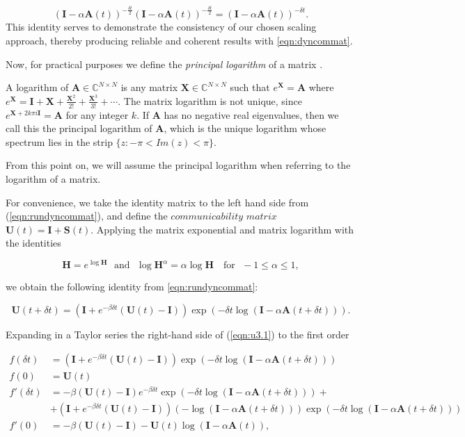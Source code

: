  $$(\mathbf{I} - \alpha\mathbf{A}(t))^{-\frac{\delta t}{2}} (\mathbf{I} - \alpha\mathbf{A}(t))^{-\frac{\delta t}{2}} = (\mathbf{I} - \alpha\mathbf{A}(t))^{-\delta t}.$$ This identity serves to demonstrate the consistency of our chosen scaling approach, thereby producing reliable and coherent results with \eqref{eqn:dyncommat}.
 
Now, for practical purposes we define the \textit{principal logarithm} of a matrix \cite[Ch.\ 11]{higham2008functions}.
\begin{definition}
    A logarithm of $\mathbf{A} \in \mathbb{C}^{N\times N}$ is any matrix $\mathbf{X}\in \mathbb{C}^{N\times N}$ such that $e^{\mathbf{X}} = \mathbf{A}$ where $e^{\mathbf{X}} = \mathbf{I} + \mathbf{X} + \frac{\mathbf{X}^2}{2!} + \frac{\mathbf{X}^3}{3!} + \cdots$. The matrix logarithm is not unique, since $e^{\mathbf{X}+2k\pi i\mathbf{I}} = \mathbf{A}$ for any integer $k$. If $\mathbf{A}$ has no negative real eigenvalues, then we call this the principal logarithm of $\mathbf{A}$, which is the unique logarithm whose spectrum lies in the strip $\{ z : −\pi < Im(z) < \pi \}$.
\end{definition}
From this point on, we will assume the principal logarithm when referring to the logarithm of a matrix. 

For convenience, we take the identity matrix to the left hand side from (\ref{eqn:rundyncommat}), and define the $\textit{communicability matrix~}$ $\mathbf{U}(t)=\mathbf{I} + \mathbf{S}(t)$. Applying the matrix exponential and matrix logarithm with the identities \cite[Ch.\ 11]{higham2008functions}

$$\mathbf{H} =e^{\log \mathbf{H}} \text{~~and~~} \log \mathbf{H}^\alpha =\alpha\log \mathbf{H} \text{~~~for~~} -1 \le \alpha \le 1,$$ 

we obtain the following identity from \eqref{eqn:rundyncommat}:

\begin{equation}
\label{eqn:u3.1}
    \mathbf{U}(t + \delta t) = \left(\mathbf{I} + e^{-\beta\delta t}(\mathbf{U}(t) - \mathbf{I})\right) \exp\left(-\delta t \log (\mathbf{I} - \alpha \mathbf{A}(t + \delta t)) \right).
\end{equation} 

Expanding in a Taylor series the right-hand side of (\ref{eqn:u3.1}) to the first order 

\begin{align*}
\label{eqn:u3.1b}
    f(\delta t) &= \left(\mathbf{I} + e^{-\beta\delta t}(\mathbf{U}(t) - \mathbf{I})\right) \exp\left(-\delta t \log (\mathbf{I} - \alpha \mathbf{A}(t + \delta t)) \right) \\ 
    f(0) &= \mathbf{U}(t)\\ 
    f'(\delta t) &= - \beta (\mathbf{U}(t) - \mathbf{I})e^{-\beta \delta t}\exp{(-\delta t \log (\mathbf{I}-\alpha \mathbf{A}(t+\delta t)))} +\\ &+ (\mathbf{I} + e^{-\beta \delta t}(\mathbf{U}(t) - \mathbf{I}))(-\log(\mathbf{I}-\alpha \mathbf{A}(t+\delta t)))\exp(-\delta t \log(\mathbf{I}-\alpha \mathbf{A}(t+\delta t)))\\
    f'(0) &= -\beta (\mathbf{U}(t) - \mathbf{I}) - \mathbf{U}(t)\log(\mathbf{I}-\alpha \mathbf{A}(t)),
\end{align*}

